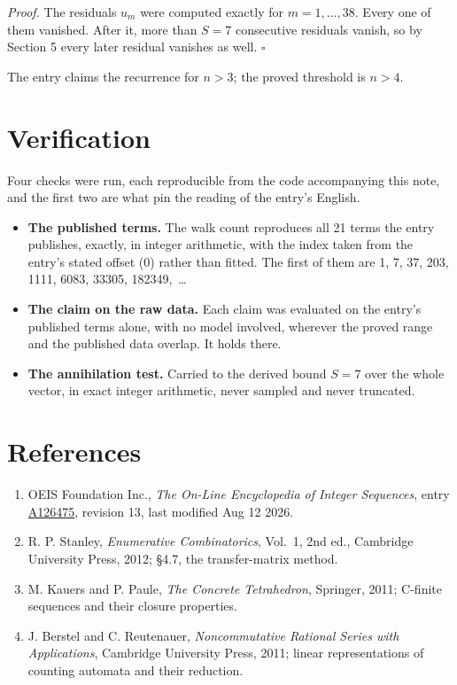 \documentclass[11pt]{article}
\theoremstyle{definition}
\begin{document}
{\itshape Proof.} The residuals $u_m$ were computed exactly for $m = 1,\dots,38$. Every one of them vanished. After it, more than $S = 7$ consecutive residuals vanish, so by Section 5 every later residual vanishes as well. $\square$

The entry claims the recurrence for $n > 3$; the proved threshold is $n > 4$.

\section{Verification}

Four checks were run, each reproducible from the code accompanying this note, and the first two are what pin the reading of the entry's English.

\begin{itemize}

\item {\bfseries The published terms.} The walk count reproduces all 21 terms the entry publishes, exactly, in integer arithmetic, with the index taken from the entry's stated offset (0) rather than fitted. The first of them are 1, 7, 37, 203, 1111, 6083, 33305, 182349,~\dots

\item {\bfseries The claim on the raw data.} Each claim was evaluated on the entry's published terms alone, with no model involved, wherever the proved range and the published data overlap. It holds there.

\item {\bfseries The annihilation test.} Carried to the derived bound $S = 7$ over the whole vector, in exact integer arithmetic, never sampled and never truncated.

\end{itemize}

\section{References}

\begin{enumerate}

\item OEIS Foundation Inc., \emph{The On-Line Encyclopedia of Integer Sequences}, entry \href{https://oeis.org/A126475}{A126475}, revision 13, last modified Aug 12 2026.

\item R. P. Stanley, \emph{Enumerative Combinatorics}, Vol.~1, 2nd ed., Cambridge University Press, 2012; \S4.7, the transfer-matrix method.

\item M. Kauers and P. Paule, \emph{The Concrete Tetrahedron}, Springer, 2011; C-finite sequences and their closure properties.

\item J. Berstel and C. Reutenauer, \emph{Noncommutative Rational Series with Applications}, Cambridge University Press, 2011; linear representations of counting automata and their reduction.

\end{enumerate}
\end{document}
